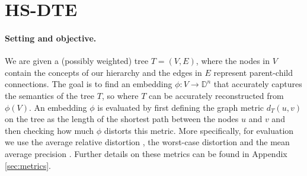 \section{HS-DTE}%
\label{sec:method_embedding}
\vspace{-0.2cm}
\paragraph{Setting and objective.}
We are given a (possibly weighted) tree $T = (V, E)$, where the nodes in $V$ contain the concepts of our hierarchy and the edges in $E$ represent parent-child connections. The goal is to find an embedding $\phi: V \rightarrow \mathbb{D}^n$ that accurately captures the semantics of the tree $T$, so where $T$ can be accurately reconstructed from $\phi(V)$. An embedding $\phi$ is evaluated by first defining the graph metric $d_T (u, v)$ on the tree as the length of the shortest path between the nodes $u$ and $v$ and then checking how much $\phi$ distorts this metric. More specifically, for evaluation we use the average relative distortion \citep{sala2018representation}, the worst-case distortion \citep{sarkar2011low} and the mean average precision \citep{nickel2017poincare}. Further details on these metrics can be found in Appendix \ref{sec:metrics}.


\vspace{-0.2cm}

